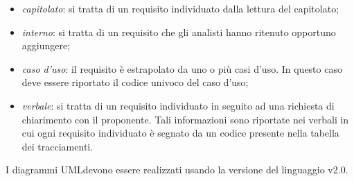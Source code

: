 \begin{itemize}
				\begin{itemize}
					\item \textit{capitolato\glo}: si tratta di un requisito individuato dalla lettura del capitolato;
					\item \textit{interno}: si tratta di un requisito che gli analisti hanno ritenuto opportuno aggiungere;
					\item \textit{caso d'uso}: il requisito è estrapolato da uno o più casi d'uso. In questo caso deve essere riportato il codice univoco del caso d'uso;
					\item \textit{verbale}: si tratta di un requisito individuato in seguito ad una richiesta di chiarimento con il proponente. Tali informazioni sono riportate nei verbali in cui ogni requisito individuato è segnato da un codice presente nella tabella dei tracciamenti. \\
				\end{itemize}
			\end{itemize}

			 \newline \newline
			I diagrammi UML\glosp devono essere realizzati usando la versione del linguaggio v2.0.

